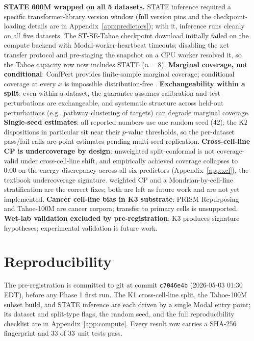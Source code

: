 \documentclass{article}
\begin{document}
\textbf{STATE 600M wrapped on all 5 datasets.} STATE inference required a specific transformer-library version window (full version pins and the checkpoint-loading details are in Appendix~\ref{app:predictors}); with it, inference runs cleanly on all five datasets. The ST-SE-Tahoe checkpoint download initially failed on the compute backend with Modal-worker-heartbeat timeouts; disabling the xet transfer protocol and pre-staging the snapshot on a CPU worker resolved it, so the Tahoe capacity row now includes STATE ($n=8$). \textbf{Marginal coverage, not conditional}: ConfPert provides finite-sample marginal coverage; conditional coverage at every $x$ is impossible distribution-free \citep{vovk2012}. \textbf{Exchangeability within a split}: even within a dataset, the guarantee assumes calibration and test perturbations are exchangeable, and systematic structure across held-out perturbations (e.g.\ pathway clustering of targets) can degrade marginal coverage. \textbf{Single-seed estimates}: all reported numbers use one random seed ($42$); the K2 dispositions in particular sit near their $p$-value thresholds, so the per-dataset pass/fail calls are point estimates pending multi-seed replication. \textbf{Cross-cell-line CP is undercoverage by design}: unweighted split-conformal is not coverage-valid under cross-cell-line shift, and empirically achieved coverage collapses to $0.00$ on the energy discrepancy across all six predictors (Appendix~\ref{app:xcl}), the textbook undercoverage signature. \citet{tibshirani2019} weighted CP and a Mondrian-by-cell-line stratification are the correct fixes; both are left as future work and are not yet implemented. \textbf{Cancer cell-line bias in K3 substrate}: PRISM Repurposing and Tahoe-100M are cancer corpora; transfer to primary cells is unsupported. \textbf{Wet-lab validation excluded by pre-registration}: K3 produces signature hypotheses; experimental validation is future work.

\section*{Reproducibility}

The pre-registration is committed to git at commit \texttt{c7046e4b} (2026-05-03 01:30 EDT), before any Phase 1 first run. The K1 cross-cell-line split, the Tahoe-100M subset build, and STATE inference are each driven by a single Modal entry point; its dataset and split-type flags, the random seed, and the full reproducibility checklist are in Appendix~\ref{app:compute}. Every result row carries a SHA-256 fingerprint and 33 of 33 unit tests pass.
\end{document}
